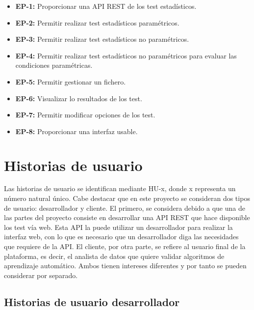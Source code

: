 \begin{itemize}
\item \textbf{EP-1:} Proporcionar una API REST de los test estadísticos.
\item \textbf{EP-2:} Permitir realizar test estadísticos paramétricos.
\item \textbf{EP-3:} Permitir realizar test estadísticos no paramétricos.
\item \textbf{EP-4:} Permitir realizar test estadísticos no paramétricos para evaluar las condiciones paramétricas.
\item \textbf{EP-5:} Permitir gestionar un fichero.
\item \textbf{EP-6:} Visualizar lo resultados de los test.
\item \textbf{EP-7:} Permitir modificar opciones de los test.
\item \textbf{EP-8:} Proporcionar una interfaz usable.
\end{itemize}


\section{Historias de usuario}
Las historias de usuario se identifican mediante HU-x, donde x representa un número natural único. Cabe destacar que en este proyecto se consideran dos tipos de usuario: desarrollador y cliente. El primero, se considera debido a que una de las partes del proyecto consiste en desarrollar una API REST que hace disponible los test vía web. Esta API la puede utilizar un desarrollador para realizar la interfaz web, con lo que es necesario que un desarrollador diga las necesidades que requiere de la API. El cliente, por otra parte, se refiere al usuario final de la plataforma, es decir, el analista de datos que quiere validar algoritmos de aprendizaje automático. Ambos tienen intereses diferentes y por tanto se pueden considerar por separado.


\subsection{Historias de usuario desarrollador}


